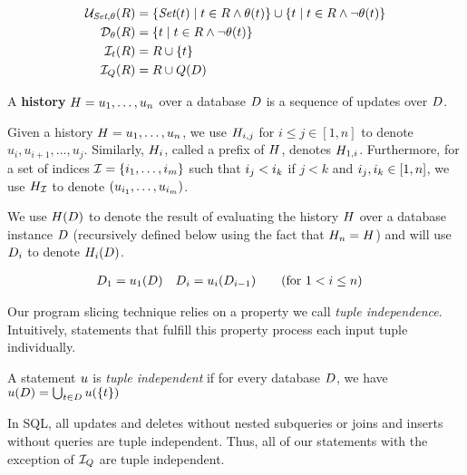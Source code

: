\begin{align}
  \mathcal{U}_{\textit{Set},\theta}(R) &= \{ \textit{Set}(t) \mid t \in R \wedge \theta(t) \} \cup \{ t \mid t \in R \wedge \neg \theta(t) \} \label{eq:update-sem}\\
  \mathcal{D}_{\theta}(R) &= \{ t \mid t \in R \wedge \neg \theta(t) \} \label{eq:delete-sem}\\
  \mathcal{I}_{t}(R) &= R \cup \{ t \} \label{eq:const-insert-sem}\\
  \mathcal{I}_{Q}(R) &= R \cup Q(D) \label{eq:query-insert-sem}
\end{align}




A \textbf{history} $H = u_1, \ldots, u_n$ 
over a database $D$ is a sequence of updates over $D$. 


Given a history $H = u_1, \ldots,u_n$, we use $H_{i,j}$ for $i \leq j \in [1,n]$ to denote $u_i, u_{i+1}, \ldots, u_j$. Similarly, $H_{i}$, called a prefix of $H$, denotes $H_{1,i}$. Furthermore, for a set of indices $\mathcal{I} = \{ i_1, \ldots, i_m \}$ such that $i_j < i_k$ if $j < k$ and $i_j, i_k \in [1,n]$, we use $H_{\mathcal{I}}$ to denote $(u_{i_1}, \ldots, u_{i_m})$.

We use $H(D)$ to denote the result of evaluating the history $H$ over a database instance $D$ (recursively defined below using the fact that $H_{n} = H$) and will use $D_{i}$ to denote $H_{i}(D)$.

\begin{align*}
  D_1 &= u_1(D) &D_i &= u_i(D_{i-1}) \tag{for $1 < i \leq n$}
\end{align*}

Our program slicing technique relies on a property we call \emph{tuple independence}. Intuitively, statements that fulfill this property process each input tuple individually.


\begin{defi}\label{def:tuple-independence}
 A statement $u$ is \emph{tuple independent} if for every database $D$, we have $u(D) = \bigcup_{t \in D} u(\{t\})$
  
  
  
\end{defi}

In SQL, all updates and deletes without nested subqueries or joins and inserts without queries are tuple independent. Thus, all of our statements with the exception of $\mathcal{I}_{Q}$ are tuple independent.


